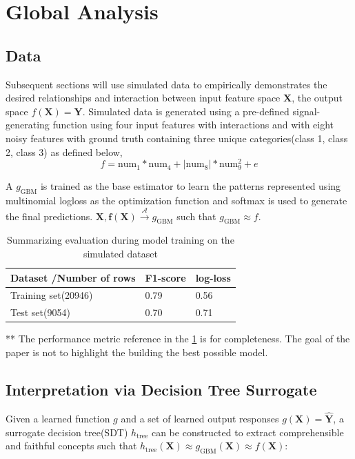 \documentclass{article}
\begin{document}

\section{Global Analysis}

\subsection{Data}
Subsequent sections will use simulated data to empirically demonstrates the desired relationships and interaction between input feature space $\mathbf{X}$, the output space $f(\mathbf{X}) = \mathbf{Y}$. Simulated data is generated using a pre-defined signal-generating function using four input features with interactions and with eight noisy features with ground truth containing three unique categories(class 1, class 2, class 3) as defined below,
\begin{equation}
\label{eq:f}
f = \text{num} _1 * \text{num}_4 + |\text{num}_8| * \text{num}_9^2 + e
\end{equation}

A $g_{\text{GBM}}$ is trained as the base estimator to learn the patterns represented using multinomial logloss as the optimization function and softmax is used to generate the final predictions. 
$ \mathbf{X}, \mathbf{f(X)} \xrightarrow{\mathcal{A}} g_{\text{GBM}}$ such that $g_{\text{GBM}} \approx f$. 

\begin{table}[H]
  \caption{Summarizing evaluation during model training on the simulated dataset}
  \label{eval-table}
  \centering
  \begin{tabular}{lll}
    \toprule
    \cmidrule{1-2}
    Dataset /Number of rows    & F1-score     & log-loss  \\
    \midrule
    Training set(20946) &  0.79 & 0.56     \\
    Test set(9054)     &  0.70 & 0.71      \\
    \bottomrule
  \end{tabular}
\end{table}
** The performance metric reference in the \ref{eval-table} is for completeness. The goal of the paper is not to highlight the building the best possible model.

\subsection{Interpretation via Decision Tree Surrogate} \label{sec:surrogate_dt}
Given a learned function $g$ and a set of learned output responses $g(\mathbf{X}) = \mathbf{\hat{Y}}$, a surrogate decision tree(SDT) $h_{\text{tree}}$ can be constructed to extract comprehensible and faithful concepts such that $h_{\text{tree}}(\mathbf{X}) \approx g_{\text{GBM}}(\mathbf{X}) \approx f(\mathbf{X})$:
\end{document}
